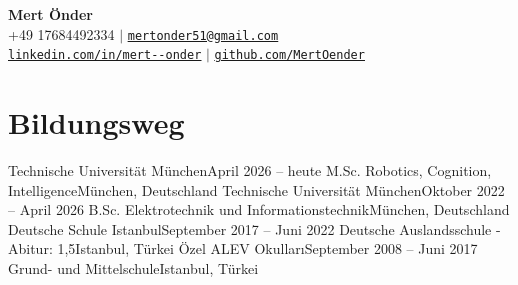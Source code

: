 \documentclass[a4paper,11pt]{article}
\begin{document}
\begin{center}
    { \textbf{\Huge Mert Önder}} \\ \vspace{3pt}
   \small +49 17684492334 $|$ \underline{\href{mailto:mertonder51@gmail.com}{\nolinkurl{mertonder51@gmail.com}}} \\ \underline{\href{https://www.linkedin.com/in/mert--onder/}{\nolinkurl{linkedin.com/in/mert--onder}}} $|$ \underline{\href{https://github.com/MertOender}{\nolinkurl{github.com/MertOender}}}
\end{center}


\section{Bildungsweg}
\resumeSubHeadingListStart
    \resumeSubheading
        {Technische Universität München}{April 2026 -- heute}
        {M.Sc. Robotics, Cognition, Intelligence}{München, Deutschland}
       \vspace{0.1cm}
    \resumeSubheading
        {Technische Universität München}{Oktober 2022 -- April 2026}
        {B.Sc. Elektrotechnik und Informationstechnik}{München, Deutschland}
        \resumeItemListStart
       \small{}
       \vspace{0.05cm}
       \resumeItemListEnd
       \vspace{0.1cm}
    \resumeSubheading
        {Deutsche Schule Istanbul}{September 2017 -- Juni 2022}
        {Deutsche Auslandsschule - Abitur: 1,5}{Istanbul, Türkei}
        \vspace{0.1cm}
    \resumeSubheading
        {Özel ALEV Okulları}{September 2008 -- Juni 2017}
        {Grund- und Mittelschule}{Istanbul, Türkei}
        \resumeItemListStart
       \small{}
        \resumeItemListEnd
\resumeSubHeadingListEnd


\end{document}
